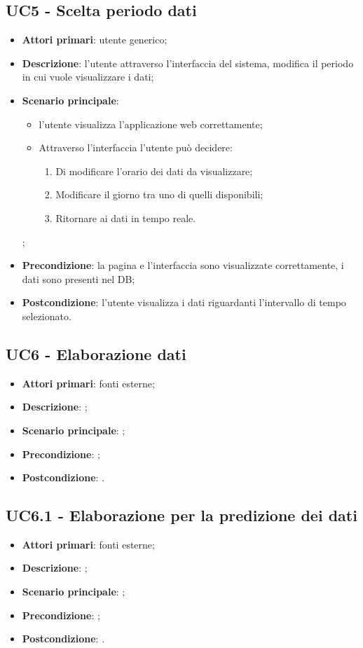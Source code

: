 \subsection{UC5 - Scelta periodo dati}
\begin{itemize}
\item \textbf{Attori primari}: utente generico;
\item \textbf{Descrizione}: l’utente attraverso l’interfaccia del sistema, modifica il periodo in cui vuole visualizzare i dati;
\item \textbf{Scenario principale}: 
	\begin{itemize}
		\item l’utente visualizza l’applicazione web correttamente;
		\item Attraverso l’interfaccia l’utente può decidere:
			\begin{enumerate}
				\item Di modificare l’orario dei dati da visualizzare;
				\item Modificare il giorno tra uno di quelli disponibili;
				\item Ritornare ai dati in tempo reale.
			\end{enumerate}
	\end{itemize};
\item \textbf{Precondizione}: la pagina e l’interfaccia sono visualizzate correttamente, i dati sono presenti nel DB;
\item \textbf{Postcondizione}: l’utente visualizza i dati riguardanti l’intervallo di tempo selezionato.
\end{itemize}

\subsection{UC6 - Elaborazione dati}
\begin{itemize}
	\item \textbf{Attori primari}: fonti esterne;
	\item \textbf{Descrizione}: ;
	\item \textbf{Scenario principale}: ;
	\item \textbf{Precondizione}: ;
	\item \textbf{Postcondizione}: .
\end{itemize}

\subsection{UC6.1 - Elaborazione per la predizione dei dati}
\begin{itemize}
	\item \textbf{Attori primari}: fonti esterne;
	\item \textbf{Descrizione}: ;
	\item \textbf{Scenario principale}: ;
	\item \textbf{Precondizione}: ;
	\item \textbf{Postcondizione}: .
\end{itemize}

